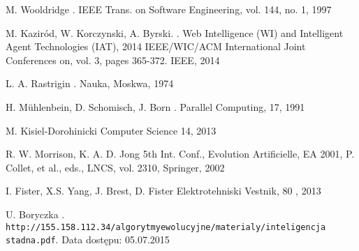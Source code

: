 \begin{thebibliography}{1}
M. Wooldridge
.
\newblock IEEE Trans. on Software Engineering, vol. 144, no. 1, 1997


M. Kaziród, W. Korczynski, A. Byrski.
.
\newblock  Web Intelligence (WI) and Intelligent Agent Technologies (IAT), 2014 IEEE/WIC/ACM International Joint Conferences on, vol. 3, pages 365-372. IEEE, 2014


L. A. Rastrigin
.
\newblock Nauka, Moskwa, 1974


 H. Mühlenbein, D. Schomisch, J. Born
.
\newblock Parallel Computing, 17, 1991


M. Kisiel-Dorohinicki
\newblock Computer Science 14, 2013


R. W. Morrison, K. A. D. Jong 
\newblock 5th Int. Conf., Evolution Artificielle, EA 2001, P. Collet, et al., eds., LNCS, vol. 2310, Springer, 2002


I. Fister, X.S. Yang, J. Brest, D. Fister
\newblock Elektrotehniski Vestnik, 80 , 2013


U. Boryczka
.
\newblock \\\texttt{http://155.158.112.34/algorytmyewolucyjne/materialy/inteligencja stadna.pdf}.
\newblock Data dostępu: 05.07.2015


\end{thebibliography}
